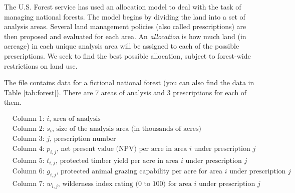 The U.S. Forest service has used an allocation model to deal with the task of managing national forests.
The model begins by dividing the land into a set of analysis areas. Several land management policies (also
called prescriptions) are then proposed and evaluated for each area.
An \emph{allocation} is how much land (in acreage) in each unique analysis area will be assigned to each of the possible prescriptions.
We seek to find the best possible allocation, subject to forest-wide restrictions on land use.

The file  contains data for a fictional national forest (you can also find the data
in Table \ref{tab:forest}). There are 7 areas of analysis and 3 prescriptions for each of them.

\begin{align*}
&\text{Column 1: $i$, area of analysis} \\
&\text{Column 2: $s_i$, size of the analysis area (in thousands of acres)} \\
&\text{Column 3: $j$, prescription number} \\
&\text{Column 4: $p_{i,j}$, net present value (NPV) per acre in area $i$ under prescription $j$} \\
&\text{Column 5: $t_{i,j}$, protected timber yield per acre in area $i$ under prescription $j$} \\
&\text{Column 6: $g_{i,j}$, protected animal grazing capability per acre for area $i$ under prescription $j$} \\
&\text{Column 7: $w_{i,j}$, wilderness index rating (0 to 100) for area $i$ under prescription $j$}
\end{align*}

